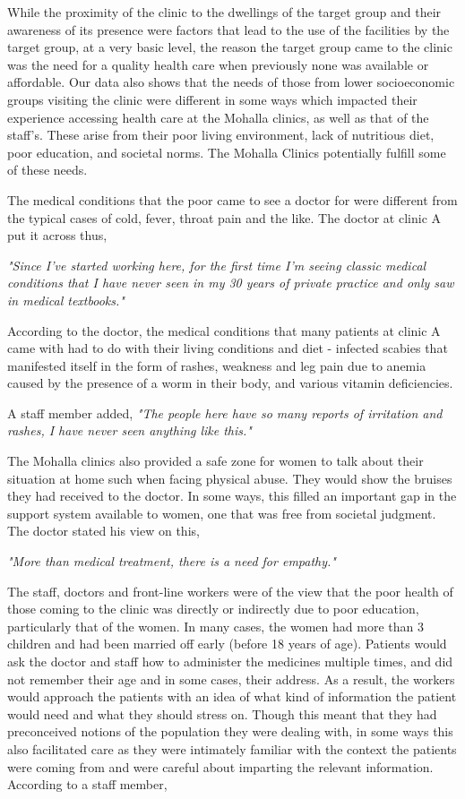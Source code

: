 While the proximity of the clinic to the dwellings of the target group and their awareness of its presence were factors that lead to the use of the facilities by the target group, at a very basic level, the reason the target group came to the clinic was the need for a quality health care when previously none was available or affordable. Our data also shows that the needs of those from lower socioeconomic groups visiting the clinic were different in some ways which impacted their experience accessing health care at the Mohalla clinics, as well as that of the staff's. These arise from their poor living environment, lack of nutritious diet, poor education, and societal norms. The Mohalla Clinics potentially fulfill some of these needs.

The medical conditions that the poor came to see a doctor for were different from the typical cases of cold, fever, throat pain and the like. The doctor at clinic A put it across thus,

\textit{"Since I've started working here, for the first time I'm seeing classic medical conditions that I have never seen in my 30 years of private practice and only saw in medical textbooks."}

According to the doctor, the medical conditions that many patients at clinic A came with had to do with their living conditions and diet - infected scabies that manifested itself in the form of rashes, weakness and leg pain due to anemia caused by the presence of a worm in their body, and various vitamin deficiencies.

A staff member added,
\textit{"The people here have so many reports of irritation and rashes, I have never seen anything like this."}

The Mohalla clinics also provided a safe zone for women to talk about their situation at home such when facing physical abuse. They would show the bruises they had received to the doctor. In some ways, this filled an important gap in the support system available to women, one that was free from societal judgment. The doctor stated his view on this, 

\textit{"More than medical treatment, there is a need for empathy."}

The staff, doctors and front-line workers were of the view that the poor health of those coming to the clinic was directly or indirectly due to poor education, particularly that of the women. In many cases, the women had more than 3 children and had been married off early (before 18 years of age). Patients would ask the doctor and staff how to administer the medicines multiple times, and did not remember their age and in some cases, their address. As a result, the workers would approach the patients with an idea of what kind of information the patient would need and what they should stress on. Though this meant that they had preconceived notions of the population they were dealing with, in some ways this also facilitated care as they were intimately familiar with the context the patients were coming from and were careful about imparting the relevant information. According to a staff member,

